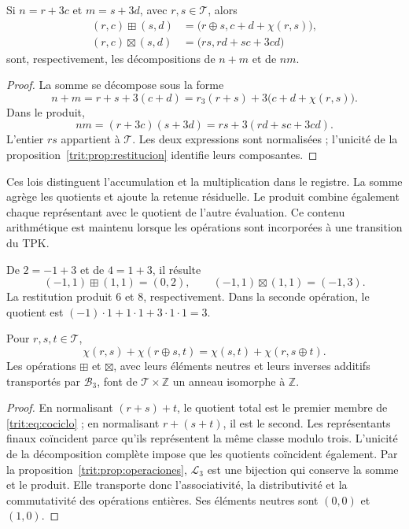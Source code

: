 \begin{proposicion}
\label{trit:prop:operaciones}
Si \(n=r+3c\) et \(m=s+3d\), avec \(r,s\in\mathcal T\), alors
\begin{align}
 (r,c)\boxplus(s,d)
 &=\bigl(r\oplus s,c+d+\chi(r,s)\bigr),
 \label{trit:eq:suma}\\
 (r,c)\boxtimes(s,d)
 &=\bigl(rs,rd+sc+3cd\bigr)
 \label{trit:eq:producto}
\end{align}
sont, respectivement, les décompositions de \(n+m\) et de \(nm\).
\end{proposicion}
\begin{proof}
La somme se décompose sous la forme
\[
 n+m=r+s+3(c+d)
     =r_3(r+s)+3\bigl(c+d+\chi(r,s)\bigr).
\]
Dans le produit,
\[
 nm=(r+3c)(s+3d)=rs+3(rd+sc+3cd).
\]
L'entier \(rs\) appartient à \(\mathcal T\). Les deux expressions sont
normalisées ; l'unicité de la proposition~\ref{trit:prop:restitucion}
identifie leurs composantes.
\end{proof}

Ces lois distinguent l'accumulation et la multiplication dans le registre.
La somme agrège les quotients et ajoute la retenue résiduelle. Le produit
combine également chaque représentant avec le quotient de l'autre évaluation.
Ce contenu arithmétique est maintenu lorsque les opérations sont incorporées
à une transition du TPK.

\begin{ejemplo}
De \(2=-1+3\) et de \(4=1+3\), il résulte
\[
 (-1,1)\boxplus(1,1)=(0,2),\qquad
 (-1,1)\boxtimes(1,1)=(-1,3).
\]
La restitution produit \(6\) et \(8\), respectivement. Dans la seconde
opération, le quotient est \((-1)\cdot1+1\cdot1+3\cdot1\cdot1=3\).
\end{ejemplo}

\begin{proposicion}
\label{trit:prop:cociclo}
Pour \(r,s,t\in\mathcal T\),
\begin{equation}
 \chi(r,s)+\chi(r\oplus s,t)
 =\chi(s,t)+\chi(r,s\oplus t).
\label{trit:eq:cociclo}
\end{equation}
Les opérations \(\boxplus\) et \(\boxtimes\), avec leurs éléments
neutres et leurs inverses additifs transportés par \(\mathcal B_3\), font
de \(\mathcal T\times\mathbb Z\) un anneau isomorphe à \(\mathbb Z\).
\end{proposicion}
\begin{proof}
En normalisant \((r+s)+t\), le quotient total est le premier membre de
\eqref{trit:eq:cociclo} ; en normalisant \(r+(s+t)\), il est le second.
Les représentants finaux coïncident parce qu'ils représentent la même classe
modulo trois. L'unicité de la décomposition complète impose que
les quotients coïncident également. Par la proposition~\ref{trit:prop:operaciones},
\(\mathcal L_3\) est une bijection qui conserve la somme et le produit. Elle transporte
donc l'associativité, la distributivité et la commutativité des
opérations entières. Ses éléments neutres sont \((0,0)\) et \((1,0)\).
\end{proof}

